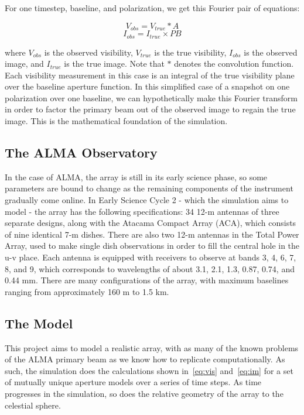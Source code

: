 \documentclass[11pt]{article}
\begin{document}
For one timestep, baseline, and polarization, we get this Fourier pair of 
equations:

\begin{equation}
    \label{eq:vis}
    V_{obs} = V_{true} * A
\end{equation}
\begin{equation}
    \label{eq:im}
    I_{obs} = I_{true} \times PB
\end{equation}

where $V_{obs}$ is the observed visibility, $V_{true}$ is the true visibility, 
$I_{obs}$ is the observed image, and $I_{true}$ is the true image. Note that 
$*$ denotes the convolution function. Each visibility measurement in this case 
is an integral of the true visibility plane over the baseline aperture 
function. In this simplified case of a snapshot on one polarization over one 
baseline, we can hypothetically make this Fourier transform in order to factor 
the primary beam out of the observed image to regain the true image. This is 
the mathematical foundation of the simulation.

\subsection{The ALMA Observatory}

In the case of ALMA, the array is still in its early science phase, so some 
parameters are bound to change as the remaining components of the instrument 
gradually come online. In Early Science Cycle 2 - which the simulation aims to 
model - the array has the following specifications: 34 12-m antennas of three 
separate designs, along with the Atacama Compact Array (ACA), which consists of 
nine identical 7-m dishes. There are also two 12-m antennas in the Total Power 
Array, used to make single dish observations in order to fill the central hole 
in the u-v place. Each antenna is equipped with receivers to observe at bands 
3, 4, 6, 7, 8, and 9, which corresponds to wavelengths of about 3.1, 2.1, 1.3, 
0.87, 0.74, and 0.44 mm. There are many configurations of the array, with 
  maximum baselines ranging from approximately 160 m to 1.5 km.

\subsection{The Model}

This project aims to model a realistic array, with as many of the known 
problems of the ALMA primary beam as we know how to replicate computationally.  
As such, the simulation does the calculations shown in~\eqref{eq:vis} 
and~\eqref{eq:im} for a set of mutually unique aperture models over a series of 
time steps. As time progresses in the simulation, so does the relative geometry 
of the array to the celestial sphere.
\end{document}
